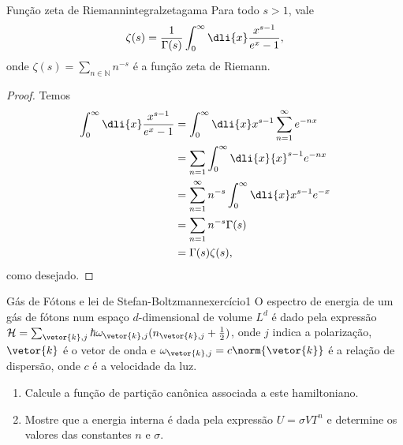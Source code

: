 \begin{lemma}{Função zeta de Riemann}{integralzetagama}
    Para todo \(s > 1\), vale
    \begin{equation*}
        \zeta(s) = \frac{1}{\Gamma(s)}\int_0^\infty \dli{x} \frac{x^{s-1}}{e^x - 1},
    \end{equation*}
    onde \(\zeta(s) = \sum_{n\in \mathbb{N}}n^{-s}\) é a função zeta de Riemann.
\end{lemma}
\begin{proof}
    Temos
    \begin{align*}
        \int_0^\infty \dli{x} \frac{x^{s-1}}{e^x - 1}
        &= \int_0^\infty\dli{x} x^{s-1} \sum_{n = 1}^\infty e^{-nx} \\
        &= \sum_{n = 1} \int_0^\infty \dli{x}{x}^{s - 1}e^{-nx} \\
        &= \sum_{n = 1}^\infty n^{-s} \int_0^\infty \dli{x} x^{s - 1} e^{-x}\\
        &= \sum_{n=1} n^{-s} \Gamma(s)\\
        &= \Gamma(s)\zeta(s),
    \end{align*}
    como desejado.
\end{proof}
\begin{exercício}{Gás de Fótons e lei de Stefan-Boltzmann}{exercício1}
    O espectro de energia de um gás de fótons num espaço \(d\)-dimensional de volume \(L^d\) é dado pela expressão \(\mathcal{H} = \sum_{\vetor{k}, j} \hbar \omega_{\vetor{k}, j}(n_{\vetor{k}, j} + \frac12)\), onde \(j\) indica a polarização, \(\vetor{k}\) é o vetor de onda e \(\omega_{\vetor{k},j} = c\norm{\vetor{k}}\) é a relação de dispersão, onde \(c\) é a velocidade da luz.
    \begin{enumerate}[label=(\alph*)]
        \item Calcule a função de partição canônica associada a este hamiltoniano.
        \item Mostre que a energia interna é dada pela expressão \(U = \sigma V T^n\) e determine os valores das constantes \(n\) e \(\sigma\).
    \end{enumerate}
\end{exercício}
